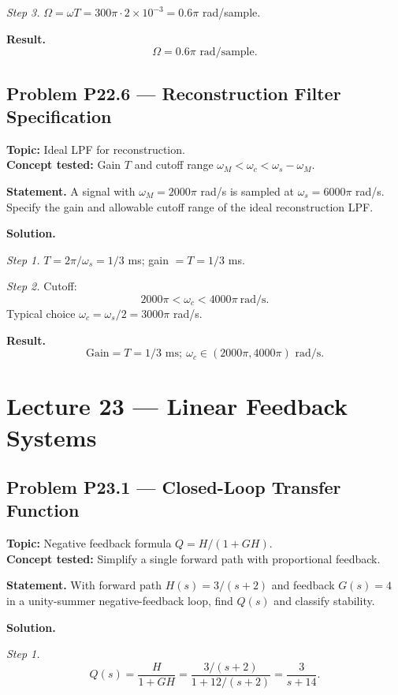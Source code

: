 \documentclass[11pt]{article}
\begin{document}
\textit{Step 3.} $\Omega = \omega T = 300\pi\cdot 2\times 10^{-3} = 0.6\pi$ rad/sample.

\textbf{Result.}
\[
\boxed{\,\Omega = 0.6\pi\text{ rad/sample}.\,}
\]

\subsection{Problem P22.6 --- Reconstruction Filter Specification}
\textbf{Topic:} Ideal LPF for reconstruction.\\
\textbf{Concept tested:} Gain $T$ and cutoff range $\omega_{M}<\omega_{c}<\omega_{s}-\omega_{M}$.

\textbf{Statement.} A signal with $\omega_{M}=2000\pi$ rad/s is sampled at
$\omega_{s}=6000\pi$ rad/s. Specify the gain and allowable cutoff range of
the ideal reconstruction LPF.

\textbf{Solution.}

\textit{Step 1.} $T = 2\pi/\omega_{s} = 1/3$ ms; gain $= T = 1/3$ ms.

\textit{Step 2.} Cutoff:
\[
2000\pi < \omega_{c} < 4000\pi\ \text{rad/s}.
\]
Typical choice $\omega_{c} = \omega_{s}/2 = 3000\pi$ rad/s.

\textbf{Result.}
\[
\boxed{\,\text{Gain} = T = 1/3\text{ ms};\ \omega_{c}\in(2000\pi,4000\pi)\text{ rad/s}.\,}
\]

\section{Lecture 23 --- Linear Feedback Systems}

\subsection{Problem P23.1 --- Closed-Loop Transfer Function}
\textbf{Topic:} Negative feedback formula $Q = H/(1+GH)$.\\
\textbf{Concept tested:} Simplify a single forward path with proportional feedback.

\textbf{Statement.} With forward path $H(s) = 3/(s+2)$ and feedback
$G(s)=4$ in a unity-summer negative-feedback loop, find $Q(s)$ and
classify stability.

\textbf{Solution.}

\textit{Step 1.}
\[
Q(s) = \frac{H}{1+GH} = \frac{3/(s+2)}{1+12/(s+2)} = \frac{3}{s+14}.
\]
\end{document}
